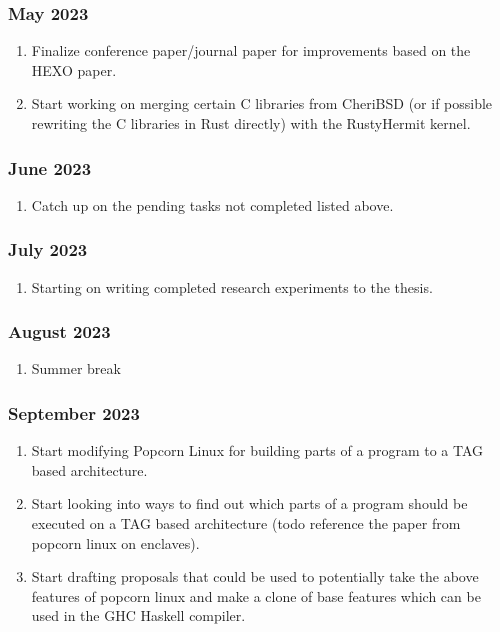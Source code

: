   \subsubsection{May 2023}
  \begin{enumerate}
     \item Finalize conference paper/journal paper for improvements based on the HEXO paper.
     \item Start working on merging certain C libraries from CheriBSD (or if possible rewriting the C libraries in Rust directly) 
     with the RustyHermit kernel.
  \end{enumerate}

  \subsubsection{June 2023}
  \begin{enumerate}
     \item Catch up on the pending tasks not completed listed above. 
  \end{enumerate}

  \subsubsection{July 2023}
  \begin{enumerate}
     \item Starting on writing completed research experiments to the thesis. 
  \end{enumerate}

  \subsubsection{August 2023}
  \begin{enumerate}
    \item Summer break 
 \end{enumerate}

 \subsubsection{September 2023}
  \begin{enumerate}
    \item Start modifying Popcorn Linux for building parts of a program to a TAG based architecture.
    \item Start looking into ways to find out which parts of a program should be executed on a TAG based architecture (todo reference
     the paper from popcorn linux on enclaves).
    \item Start drafting proposals that could be used to potentially take the above features of popcorn linux and make a clone of 
    base features which can be used in the GHC Haskell compiler.
 \end{enumerate}

